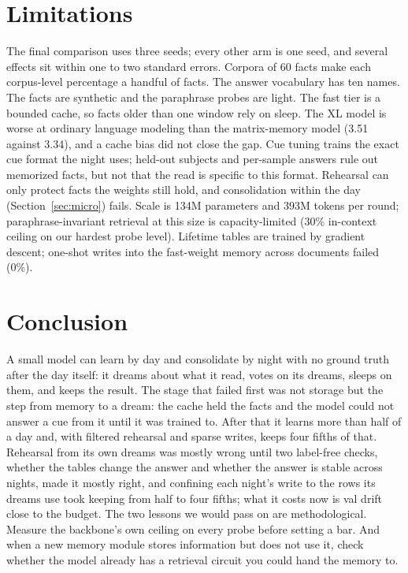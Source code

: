 \documentclass[11pt]{article}
\begin{document}
\section{Limitations}
The final comparison uses three seeds; every other arm is one seed, and
several effects sit within one to two standard errors.
Corpora of 60 facts make each corpus-level percentage a handful of facts. The
answer vocabulary has ten names. The facts are synthetic and the paraphrase
probes are light. The fast tier is a bounded cache, so facts older than one
window rely on sleep. The XL model is worse at ordinary language modeling than
the matrix-memory model (3.51 against 3.34), and a cache bias did not close the
gap. Cue tuning trains the exact cue format the night uses; held-out subjects
and per-sample answers rule out memorized facts, but not that the read is
specific to this format. Rehearsal can only protect facts the weights still
hold, and consolidation within the day (Section~\ref{sec:micro}) fails. Scale is 134M parameters and 393M tokens per round;
paraphrase-invariant retrieval at this size is capacity-limited (30\% in-context
ceiling on our hardest probe level). Lifetime tables are trained by
gradient descent; one-shot writes into the fast-weight memory across documents
failed (0\%).

\section{Conclusion}
A small model can learn by day and consolidate by night with no ground truth
after the day itself: it dreams about what it read, votes on its dreams, sleeps
on them, and keeps the result. The stage that failed first was not storage
but the step from memory to a dream: the cache held the facts and the model
could not answer a cue from it until it was trained to. After that it learns
more than half of a day and, with filtered rehearsal and sparse writes, keeps
four fifths of that. Rehearsal from its own
dreams was mostly wrong until two label-free checks, whether the tables change
the answer and whether the answer is stable across nights, made it mostly
right, and confining each night's write to the rows its dreams use took
keeping from half to four fifths; what it costs now is val drift close to the
budget. The two lessons we would pass on are methodological. Measure the
backbone's own ceiling on every probe before setting a bar. And when a new
memory module stores information but does not use it, check whether the model
already has a retrieval circuit you could hand the memory to.



\end{document}
